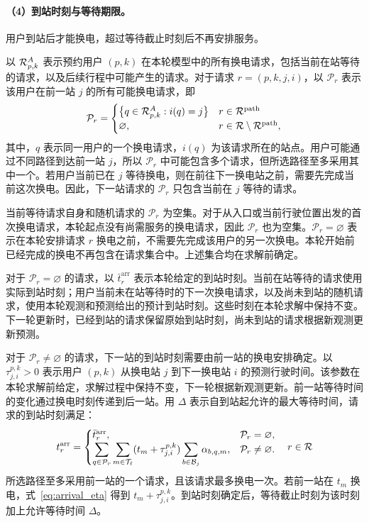 \paragraph{（4）到站时刻与等待期限。}
用户到站后才能换电，超过等待截止时刻后不再安排服务。

以 $\mathcal R_{p,k}^A$ 表示预约用户 $(p,k)$ 在本轮模型中的所有换电请求，包括当前在站等待的请求，以及后续行程中可能产生的请求。对于请求 $r=(p,k,j,i)$，以 $\mathcal P_r$ 表示该用户在前一站 $j$ 的所有可能换电请求，即
\[
\mathcal P_r=
\begin{cases}
\bigl\{q\in\mathcal R_{p,k}^A:i(q)=j\bigr\}
&r\in\mathcal R^{\mathrm{path}}\\
\varnothing,&r\in\mathcal R\setminus\mathcal R^{\mathrm{path}},
\end{cases}
\]
其中，$q$ 表示同一用户的一个换电请求，$i(q)$ 为该请求所在的站点。用户可能通过不同路径到达前一站 $j$，所以 $\mathcal P_r$ 中可能包含多个请求，但所选路径至多采用其中一个。若用户当前已在 $j$ 等待换电，则在前往下一换电站之前，需要先完成当前这次换电。因此，下一站请求的 $\mathcal P_r$ 只包含当前在 $j$ 等待的请求。

当前等待请求自身和随机请求的 $\mathcal P_r$ 为空集。对于从入口或当前行驶位置出发的首次换电请求，本轮起点没有尚需服务的换电请求，因此 $\mathcal P_r$ 也为空集。$\mathcal P_r=\varnothing$ 表示在本轮安排请求 $r$ 换电之前，不需要先完成该用户的另一次换电。本轮开始前已经完成的换电不再包含在请求集合中。上述集合均在求解前确定。

对于 $\mathcal P_r=\varnothing$ 的请求，以 $\bar t_r^{\mathrm{arr}}$ 表示本轮给定的到站时刻。当前在站等待的请求使用实际到站时刻；用户当前未在站等待时的下一次换电请求，以及尚未到站的随机请求，使用本轮观测和预测给出的预计到站时刻。这些时刻在本轮求解中保持不变。下一轮更新时，已经到站的请求保留原始到站时刻，尚未到站的请求根据新观测更新预测。

对于 $\mathcal P_r\ne\varnothing$ 的请求，下一站的到站时刻需要由前一站的换电安排确定。以 $\tau_{j,i}^{p,k}>0$ 表示用户 $(p,k)$ 从换电站 $j$ 到下一换电站 $i$ 的预测行驶时间。该参数在本轮求解前给定，求解过程中保持不变，下一轮根据新观测更新。前一站等待时间的变化通过换电时刻传递到后一站。用 $\Delta$ 表示自到站起允许的最大等待时间，请求的到站时刻满足：
\begin{equation}
t_r^{\mathrm{arr}}=\begin{cases}
\bar t_r^{\mathrm{arr}},&\mathcal P_r=\varnothing,\\
\displaystyle\sum_{q\in\mathcal P_r}\sum_{m\in\mathcal T_\ell}
(t_m+\tau_{j,i}^{p,k})\sum_{b\in\mathcal B_j}\alpha_{b,q,m},
&\mathcal P_r\ne\varnothing.
\end{cases}
\quad r\in\mathcal R
\label{eq:arrival_eta}
\end{equation}
所选路径至多采用前一站的一个请求，且该请求最多换电一次。若前一站在 $t_m$ 换电，式~\eqref{eq:arrival_eta} 得到 $t_m+\tau_{j,i}^{p,k}$。到站时刻确定后，等待截止时刻为该时刻加上允许等待时间 $\Delta$。


